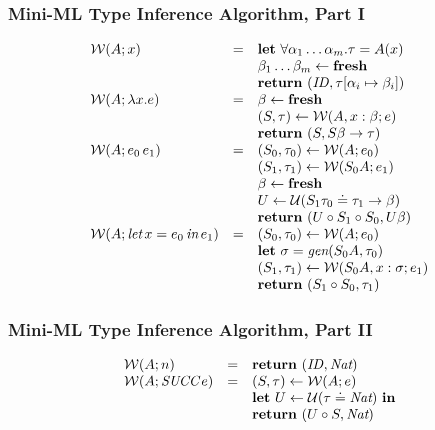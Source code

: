\documentclass[pdftex,aspectratio=169]{beamer}
\begin{document}
\begin{frame}
  \frametitle{Mini-ML Type Inference Algorithm, Part I}
  \begin{displaymath}
    \begin{array}{lcl}
      \mathcal{W} (A ; x) &=& \mathbf{let}\
      \forall\alpha_1\dots\alpha_m.\tau = A (x) \\
      && \beta_1\dots\beta_m \gets \mathbf{fresh} \\
      && \mathbf{return}\ (\mathit{ID}, \tau[\alpha_i\mapsto\beta_i])
      \\
      \mathcal{W} (A ; \lambda x.e) &=&
      \beta \gets \mathbf{fresh} \\
      &&  (S, \tau) \gets \mathcal{W} (A, x: \beta; e) \\
      && \mathbf{return}\ (S, S\beta \to \tau)
      \\
      \mathcal{W} (A; e_0\,{e_1}) &=&
      (S_0, \tau_0) \gets \mathcal{W} (A ; e_0) \\
      && (S_1, \tau_1) \gets \mathcal{W} (S_0A ; e_1)\\
      &&\beta \gets \mathbf{fresh}\\
      &&U \gets \mathcal{U} (S_1\tau_0 \doteq \tau_1\to \beta)\\
      &&\mathbf{return}\ (U \circ S_1 \circ S_0, U\beta)
      \\
      \mathcal{W} (A; \textit{let}\,x=e_0\,\textit{in}\,{e_1}) &=&
      (S_0, \tau_0) \gets \mathcal{W} (A ; e_0)\\
      && \mathbf{let}\ \sigma = \textit{gen} (S_0A, \tau_0) \\
      && (S_1, \tau_1) \gets \mathcal{W} (S_0A, x :\sigma; e_1) \\
      &&\mathbf{return}\ (S_1\circ S_0, \tau_1) \\
    \end{array}
  \end{displaymath}
\end{frame}

\begin{frame}
  \frametitle{Mini-ML Type Inference Algorithm, Part II}
 \begin{displaymath}
   \begin{array}{lcl}
      \calW (\Tenv ;  n) &=&
      \mathbf{return}\ (\mathit{ID}, \Nat) \\
      \calW (\Tenv ; \Succ e) &=&
      (S, \tau) \gets \calW (\Tenv ; e) \\
      &&\mathbf{let}\ U \gets \calU (\tau\doteq\Nat)\ \mathbf{in} \\
      &&\mathbf{return}\ (U \circ S, \Nat)
   \end{array}
 \end{displaymath}
\end{frame}
\end{document}
